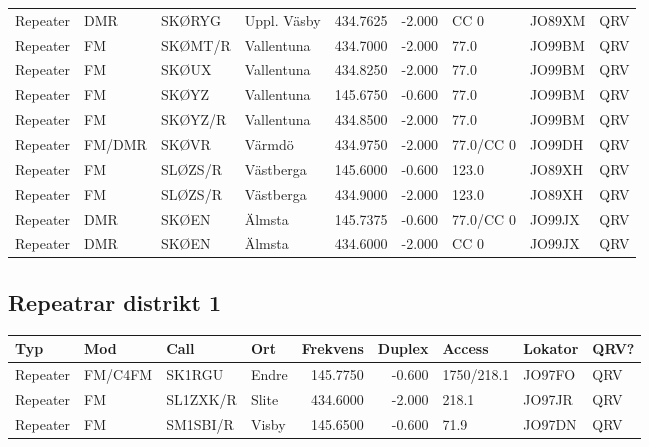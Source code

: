 \begin{landscape}
\begin{longtable}{llllrrlll}
	Repeater & DMR         & SKØRYG   & Uppl. Väsby     &     434.7625 &     -2.000 & CC 0       & JO89XM      & QRV      \\
	Repeater & FM          & SKØMT/R  & Vallentuna      &     434.7000 &     -2.000 & 77.0       & JO99BM      & QRV      \\
	Repeater & FM          & SKØUX    & Vallentuna      &     434.8250 &     -2.000 & 77.0       & JO99BM      & QRV      \\
	Repeater & FM          & SKØYZ    & Vallentuna      &     145.6750 &     -0.600 & 77.0       & JO99BM      & QRV      \\
	Repeater & FM          & SKØYZ/R  & Vallentuna      &     434.8500 &     -2.000 & 77.0       & JO99BM      & QRV      \\
	Repeater & FM/DMR      & SKØVR    & Värmdö          &     434.9750 &     -2.000 & 77.0/CC 0  & JO99DH      & QRV      \\
	Repeater & FM          & SLØZS/R  & Västberga       &     145.6000 &     -0.600 & 123.0      & JO89XH      & QRV      \\
	Repeater & FM          & SLØZS/R  & Västberga       &     434.9000 &     -2.000 & 123.0      & JO89XH      & QRV      \\
	Repeater & DMR         & SKØEN    & Älmsta          &     145.7375 &     -0.600 & 77.0/CC 0  & JO99JX      & QRV      \\
	Repeater & DMR         & SKØEN    & Älmsta          &     434.6000 &     -2.000 & CC 0       & JO99JX      & QRV     
\end{longtable}


\clearpage

\subsection{Repeatrar distrikt 1}

\begin{longtable}{llllrrlll}
	\bf Typ  & \bf Mod & \bf Call & \bf Ort & \bf Frekvens & \bf Duplex & \bf Access & \bf Lokator & \bf QRV? \\ \hline
	\endhead
	Repeater & FM/C4FM & SK1RGU   & Endre   &     145.7750 &     -0.600 & 1750/218.1 & JO97FO      & QRV      \\
	Repeater & FM      & SL1ZXK/R & Slite   &     434.6000 &     -2.000 & 218.1      & JO97JR      & QRV      \\
	Repeater & FM      & SM1SBI/R & Visby   &     145.6500 &     -0.600 & 71.9       & JO97DN      & QRV     
\end{longtable}



\end{landscape}
